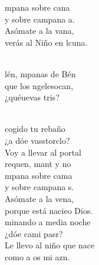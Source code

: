 \documentclass[12pt]{article}
\begin{document}
\begin{multicols*}{2}
\begin{cancion}%
	mpana sobre cana\\
	y sobre campana a.\\
	Asómate a la vana,\\
	verás al Niño en lcuna.\\\jump\\
	\begin{chorus}%
	lén, mpanas de Bén\\
	que los ngelesocan,\\
	¿quéuevas tris?  \\
	\end{chorus}%
	\jump\\
	cogido tu rebaño\\
	¿a dóe vasstorclo? \\
Voy a llevar al portal\\
	requen, mant y no \\
	mpana sobre cama\\
	y sobre campana s.\\
	Asómate a la vena,\\
	porque está nacieo Dios.\\
	minando a media noche\\
	¿dóe cami pasr? \\
Le llevo al niño que nace\\
	como a os mi azn.\\
\end{cancion}%


\end{multicols*}
\end{document}

